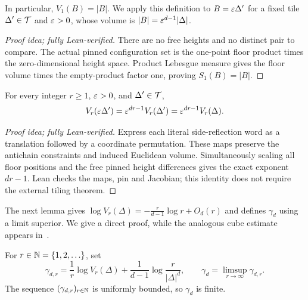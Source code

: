 \documentclass[11pt,letterpaper]{article}
\begin{document}
In particular, $V_1(B)=|B|$. We apply this definition to $B=\varepsilon\Delta'$ for a fixed tile $\Delta'\in \mathcal T$ and $\varepsilon>0$, whose volume is $|B|=\varepsilon^{d-1}|\Delta|$.

\begin{proof}[Proof idea; fully Lean-verified]
There are no free heights and no distinct pair to compare. The actual pinned configuration set is the one-point floor product times the zero-dimensional height space. Product Lebesgue measure gives the floor volume times the empty-product factor one, proving $S_1(B)=|B|$.
\end{proof}


\begin{lemma}
      For every integer $r\ge1$, $\varepsilon>0$, and $\Delta'\in\mathcal T$,
      \begin{equation}\label{eq:cut-scale}
            V_r(\varepsilon\Delta') =\varepsilon^{dr-1}V_r(\Delta') =\varepsilon^{dr-1}V_r(\Delta).
      \end{equation}
\end{lemma}

\begin{proof}[Proof idea; fully Lean-verified]
Express each literal side-reflection word as a translation followed by a coordinate permutation. These maps preserve the antichain constraints and induced Euclidean volume. Simultaneously scaling all floor positions and the free pinned height differences gives the exact exponent $dr-1$. Lean checks the maps, pin and Jacobian; this identity does not require the external tiling theorem.
\end{proof}

The next lemma gives $\log V_r(\Delta)=-\frac r{d-1}\log r+O_d(r)$ and defines $\gamma_d$ using a limit superior. We give a direct proof, while the analogous cube estimate appears in~\cite{GP}.

\begin{lemma}\label{lem:constant}
      For $r\in\mathbb N=\{1,2,\ldots\}$, set
      \begin{equation}\label{eq:gamma}
            \gamma_{d,r}=\frac1r\log V_r(\Delta)+\frac1{d-1}\log\frac r{|\Delta|^d}, \qquad \gamma_d=\limsup_{r\to\infty}\gamma_{d,r}.
      \end{equation}
      The sequence $(\gamma_{d,r})_{r\in\mathbb N}$ is uniformly bounded, so $\gamma_d$ is finite.
\end{lemma}
\end{document}
